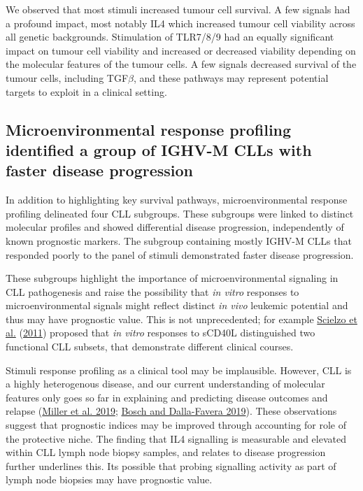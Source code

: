 \documentclass[11pt, a4paper, twosided]{book}
\begin{document}
We observed that most stimuli increased tumour cell survival. A few signals had a profound impact, most notably IL4 which increased tumour cell viability across all genetic backgrounds. Stimulation of TLR7/8/9 had an equally significant impact on tumour cell viability and increased or decreased viability depending on the molecular features of the tumour cells. A few signals decreased survival of the tumour cells, including TGF\(\beta\), and these pathways may represent potential targets to exploit in a clinical setting.

\hypertarget{microenvironmental-response-profiling-identified-a-group-of-ighv-m-clls-with-faster-disease-progression}{%
\subsection{Microenvironmental response profiling identified a group of IGHV-M CLLs with faster disease progression}\label{microenvironmental-response-profiling-identified-a-group-of-ighv-m-clls-with-faster-disease-progression}}

In addition to highlighting key survival pathways, microenvironmental response profiling delineated four CLL subgroups. These subgroups were linked to distinct molecular profiles and showed differential disease progression, independently of known prognostic markers. The subgroup containing mostly IGHV-M CLLs that responded poorly to the panel of stimuli demonstrated faster disease progression.

These subgroups highlight the importance of microenvironmental signaling in CLL pathogenesis and raise the possibility that \emph{in vitro} responses to microenvironmental signals might reflect distinct \emph{in vivo} leukemic potential and thus may have prognostic value. This is not unprecedented; for example \protect\hyperlink{ref-Scielzo2011}{Scielzo et al.} (\protect\hyperlink{ref-Scielzo2011}{2011}) proposed that \emph{in vitro} responses to sCD40L distinguished two functional CLL subsets, that demonstrate different clinical courses.

Stimuli response profiling as a clinical tool may be implausible. However, CLL is a highly heterogenous disease, and our current understanding of molecular features only goes so far in explaining and predicting disease outcomes and relapse (\protect\hyperlink{ref-Miller2019}{Miller et al. 2019}; \protect\hyperlink{ref-Bosch2019}{Bosch and Dalla-Favera 2019}). These observations suggest that prognostic indices may be improved through accounting for role of the protective niche. The finding that IL4 signalling is measurable and elevated within CLL lymph node biopsy samples, and relates to disease progression further underlines this. Its possible that probing signalling activity as part of lymph node biopsies may have prognostic value.
\end{document}
